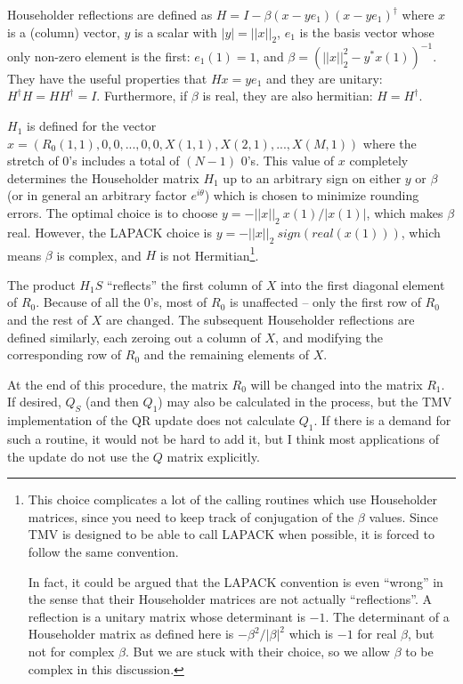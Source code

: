 Householder reflections are defined as $H = I - \beta (x - y e_1)  (x - y e_1)^\dagger$
where $x$ is a (column) vector, $y$ is a scalar with $|y| = ||x||_2$, $e_1$ is the
basis vector whose only non-zero element is the first: $e_1(1) = 1$, and
$\beta = (||x||_2^2 - y^* x(1))^{-1}$.
They have the useful properties that $H x = y e_1$ and they are unitary:
$H^\dagger H = H H^\dagger = I$.
Furthermore, if $\beta$ is real, they are also hermitian: $H = H^\dagger$.

$H_1$ is defined for the vector 
$x = (R_0(1,1), 0, 0, ... , 0, 0, X(1,1), X(2,1), ... , X(M,1) )$ 
where the stretch of $0$'s includes a total of $(N-1)$ $0$'s. This value of 
$x$ completely determines the Householder matrix $H_1$ up to an arbitrary sign
on either $y$ or $\beta$ (or in general an arbitrary factor $e^{i \theta}$) which is 
chosen to minimize rounding errors.  The optimal choice is to choose
$y = -||x||_2\:x(1)/|x(1)|$, which makes $\beta$ real.  
However, the LAPACK choice is $y = -||x||_2 \:sign(real(x(1)))$, which means
$\beta$ is complex, and $H$ is not Hermitian\footnote{
This choice complicates a lot of the calling routines which use
Householder matrices, since you need to keep track of conjugation of the 
$\beta$ values.  Since TMV is designed to be able to call LAPACK
when possible, it is forced to follow the same convention.

In fact, it could be argued that the LAPACK convention is even ``wrong'' in the sense that
their Householder matrices are not actually ``reflections''.  A reflection is a 
unitary matrix whose determinant is $-1$.  The determinant of a Householder 
matrix as defined here is $-\beta^2/|\beta|^2$ which is $-1$ for real $\beta$, 
but not for complex $\beta$.  But we are stuck with their choice, so we allow $\beta$
to be complex in this discussion.
}.

The product $H_1 S$ ``reflects'' the first column
of $X$ into the first diagonal element of $R_0$.  Because of all the $0$'s, 
most of $R_0$ is unaffected -- only the first row of $R_0$ and the rest of $X$
are changed.
The subsequent Householder reflections are defined similarly, each zeroing out
a column of $X$, and modifying the corresponding row of $R_0$ and the 
remaining elements of $X$.

At the end of this procedure, the matrix $R_0$ will be changed into the 
matrix $R_1$.  If desired, $Q_S$ (and then $Q_1$) 
may also be calculated in the process, but the 
TMV implementation of the QR update does not calculate $Q_1$.
If there is a demand for such a routine, it would not be hard to add it, 
but I think most applications of the update do not use the $Q$ matrix explicitly.

